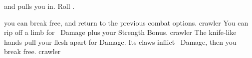 and pulls you in.
Roll .

\begin{selectPath}
  {you can break free, and return to the previous combat options.}%
  {crawler}
  {You can rip off a limb for ~Damage plus your Strength Bonus.}%
  {crawler}
  {The knife-like hands pull your flesh apart for  Damage.}%
  {}
  {Its claws inflict ~Damage, then you break free.}%
  {crawler}
\end{selectPath}


